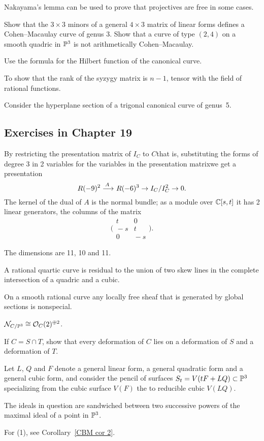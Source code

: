 Nakayama's lemma can be used to prove that projectives are free
%
in some cases.

Show that the $3\times 3$ minors of a general $4\times 3$ matrix
of linear forms defines a Cohen--Macaulay curve
of genus 3. Show that a curve of type $(2,4)$ on a smooth quadric in
${\mathbb P}^3$ is not arithmetically Cohen--Macaulay.

Use the formula for the Hilbert function of the canonical curve.

To show that the rank of the syzygy matrix is $n-1$, tensor with
the field of rational functions.

Consider the
hyperplane section of a trigonal canonical curve of genus~5.

\goodbreak

\subsection*{Exercises in Chapter 19\nopunct}

By
restricting the presentation matrix of $I_C$ to $C$\emdash that is,
sub\-sti\-tuting the forms of degree 3 in 2 variables for the variables in
the presentation \null matrix\emdash we get a presentation
$$
R(-9)^2 \ruto {\,A} R(-6)^3 \to I_C/I_C^2 \to 0
.
$$
The kernel of the dual of $A$ is the normal bundle; 
as a module over ${\mathbb C}[s,t]$ it has 2 linear
generators, the columns of the matrix
$$
\biggl(
\begin{smallmatrix}
t&0\\[2pt]
\!-s&t\\[2pt]
0&\!-s
\end{smallmatrix}
\biggr).
$$

The dimensions are 11, 10 and 11.

A rational quartic curve is residual to the union of two skew
lines in the complete intersection of a quadric and a cubic.

On a smooth rational curve any locally free sheaf that is generated
by global sections is nonspecial.

${\mathcal N}_{C/{\mathbb P}^3} \cong {\mathcal O}_C(2)^{\oplus 2}$.

If $C = S \cap T$, show that every deformation of $C$ lies on a
deformation of $S$ and a deformation of $T$.

Let $L$, $Q$ and $F$ denote a general linear form,
a general quadratic form and a general cubic form, and consider the
pencil of surfaces $S_t = V(tF + LQ) \subset {\mathbb P}^3$ specializing from
the cubic surface $V(F)$ the to reducible cubic $V(LQ)$.

The ideals in question are sandwiched between two successive powers
of the maximal ideal of a point in ${\mathbb P}^3$.

For (1), see Corollary~\ref{CBM cor 2}.
\endgroup

